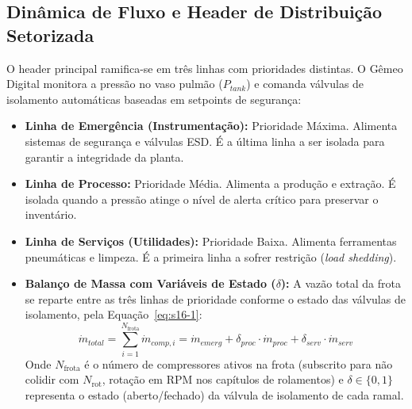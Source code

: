 \documentclass[12pt,a4paper]{article}
\numberwithin{equation}{section}
\numberwithin{table}{section}
\numberwithin{figure}{section}
\begin{document}
\subsection{Dinâmica de Fluxo e Header de Distribuição Setorizada}

O header principal ramifica-se em três linhas com prioridades distintas. O Gêmeo Digital monitora a pressão no vaso pulmão ($P_{tank}$) e comanda válvulas de isolamento automáticas baseadas em setpoints de segurança:

\begin{itemize}
	\item \textbf{Linha de Emergência (Instrumentação):} Prioridade Máxima. Alimenta sistemas de segurança e válvulas ESD. É a última linha a ser isolada para garantir a integridade da planta.
	\item \textbf{Linha de Processo:} Prioridade Média. Alimenta a produção e extração. É isolada quando a pressão atinge o nível de alerta crítico para preservar o inventário.
	\item \textbf{Linha de Serviços (Utilidades):} Prioridade Baixa. Alimenta ferramentas pneumáticas e limpeza. É a primeira linha a sofrer restrição (\textit{load shedding}).
	\item \textbf{Balanço de Massa com Variáveis de Estado ($\delta$):} A vazão total da frota se reparte entre as três linhas de prioridade conforme o estado das válvulas de isolamento, pela Equação~\eqref{eq:s16-1}:
	\begin{equation}\label{eq:s16-1}
\dot{m}_{total} = \sum_{i=1}^{N_{\text{frota}}} \dot{m}_{comp,i} = \dot{m}_{emerg} + \delta_{proc} \cdotp \dot{m}_{proc} + \delta_{serv} \cdotp \dot{m}_{serv}
\end{equation}
	Onde $N_{\text{frota}}$ é o número de compressores ativos na frota (subscrito para não colidir com $N_{\text{rot}}$, rotação em RPM nos capítulos de rolamentos) e $\delta \in \{0, 1\}$ representa o estado (aberto/fechado) da válvula de isolamento de cada ramal.
\end{itemize}
\end{document}
